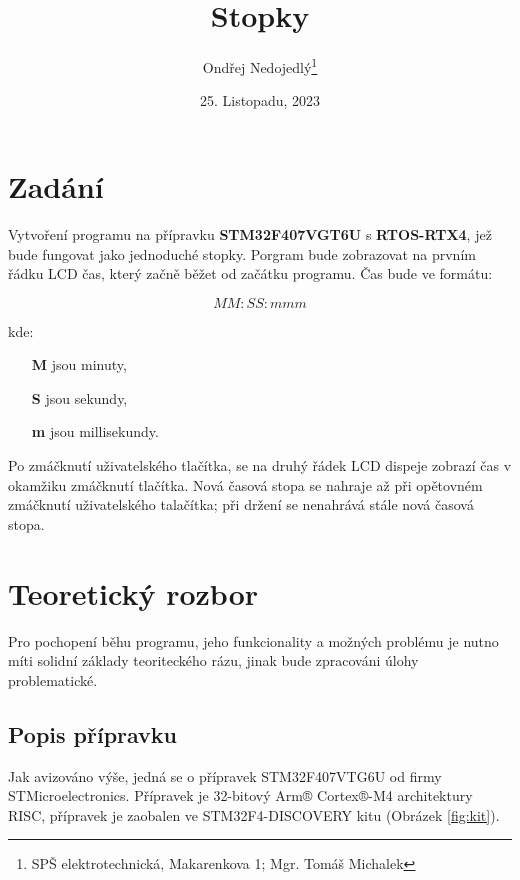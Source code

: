 \documentclass[10pt]{article}
\author{Ondřej Nedojedlý\thanks{SPŠ elektrotechnická, Makarenkova 1; Mgr. Tomáš Michalek}}
\date{25. Listopadu, 2023}
\title{\Huge{\bf{Stopky}}}
\begin{document}
\maketitle

\tableofcontents
\listoffigures
\listoftables

\newpage

\section{Zadání}

Vytvoření programu na přípravku \textbf{STM32F407VGT6U} s \textbf{RTOS-RTX4}, jež bude fungovat jako jednoduché stopky.
Porgram bude zobrazovat na prvním řádku LCD čas, který začně běžet od začátku programu.
Čas bude ve formátu:

$$MM:SS:mmm$$

kde:  
\begin{itemize}
\item[\textbf{M}] jsou minuty,
\item[\textbf{S}] jsou sekundy,
\item[\textbf{m}] jsou millisekundy.
\end{itemize}

Po zmáčknutí uživatelského tlačítka, se na druhý řádek LCD dispeje zobrazí čas v okamžiku
zmáčknutí tlačítka. Nová časová stopa se nahraje až při opětovném zmáčknutí uživatelského talačítka;
při držení se nenahrává stále nová časová stopa.

\section{Teoretický rozbor}

Pro pochopení běhu programu, jeho funkcionality a možných problému je nutno míti solidní základy
teoriteckého rázu, jinak bude zpracováni úlohy problematické.

\subsection{Popis přípravku}

Jak avizováno výše, jedná se o přípravek STM32F407VTG6U od firmy STMicroelectronics. Přípravek
je 32-bitový Arm® Cortex®-M4 architektury RISC, přípravek je zaobalen ve
STM32F4-DISCOVERY kitu (Obrázek \ref{fig:kit}).
\end{document}
